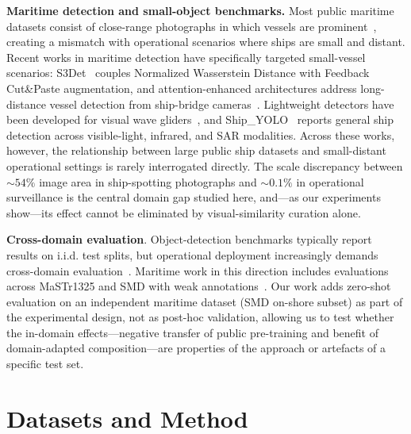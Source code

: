 \documentclass[10pt,conference]{IEEEtran}
\begin{document}
\textbf{Maritime detection and small-object benchmarks.} Most public maritime datasets consist of close-range photographs in which vessels are prominent~\cite{shao2018seaships,teixeira2025inatechships}, creating a mismatch with operational scenarios where ships are small and distant. Recent works in maritime detection have specifically targeted small-vessel scenarios: S3Det~\cite{li2024s3det} couples Normalized Wasserstein Distance with Feedback Cut\&Paste augmentation, and attention-enhanced architectures address long-distance vessel detection from ship-bridge cameras~\cite{zhang2025longdistance}. Lightweight detectors have been developed for visual wave gliders~\cite{ding2025waveglider}, and Ship\_YOLO~\cite{li2025shipyolo} reports general ship detection across visible-light, infrared, and SAR modalities.
 Across these works, however, the relationship between large public ship datasets and small-distant operational settings is rarely interrogated directly. The scale discrepancy between $\sim 54\%$ image area in ship-spotting photographs and $\sim 0.1\%$ in operational surveillance is the central domain gap studied here, and—as our experiments show—its effect cannot be eliminated by visual-similarity curation alone.

 \textbf{Cross-domain evaluation}. Object-detection benchmarks typically report results on i.i.d. test splits, but operational deployment increasingly demands cross-domain evaluation~\cite{oza2023uda}. Maritime work in this direction includes evaluations across MaSTr1325 and SMD with weak annotations~\cite{bovcon2022slr}. Our work adds zero-shot evaluation on an independent maritime dataset (SMD on-shore subset) as part of the experimental design, not as post-hoc validation, allowing us to test whether the in-domain effects—negative transfer of public pre-training and benefit of domain-adapted composition—are properties of the approach or artefacts of a specific test set.

\section{Datasets and Method}
\end{document}
